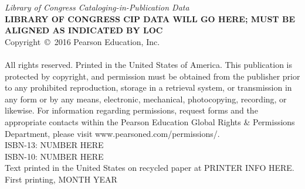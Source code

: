 {\noindent\textit{Library of Congress Cataloging-in-Publication Data}\\[.75ex]  %
\textbf{LIBRARY OF CONGRESS CIP DATA WILL GO HERE; MUST BE ALIGNED AS INDICATED BY LOC}\\[.75ex]
\noindent Copyright~\copyright~2016 Pearson Education, Inc.\\
\hspace{\fill}\\
\noindent All rights reserved. Printed in the United States of America. This publication is protected by copyright, and permission must be obtained from the publisher prior to any prohibited reproduction, storage in a retrieval system, or transmission in any form or by any means, electronic, mechanical, photocopying, recording, or likewise. For information regarding permissions, request forms and the appropriate contacts within the Pearson Education Global Rights \& Permissions Department, please visit www.pearsoned.com/permissions/.\\[.75ex]

\noindent ISBN-13: NUMBER HERE\\[-.5ex] %
\noindent ISBN-10: NUMBER HERE \\[-.5ex] %
\noindent Text printed in the United States on recycled paper at PRINTER INFO HERE.\\[-.5ex] %
\noindent First printing, MONTH YEAR %
}